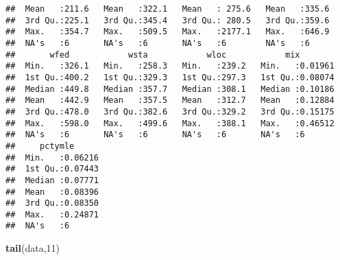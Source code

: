\documentclass[]{article}
\newenvironment{Shaded}{\begin{snugshade}}{\end{snugshade}}
\newcommand{\KeywordTok}[1]{\textcolor[rgb]{0.13,0.29,0.53}{\textbf{#1}}}
\newcommand{\DecValTok}[1]{\textcolor[rgb]{0.00,0.00,0.81}{#1}}
\newcommand{\NormalTok}[1]{#1}
\begin{document}
\begin{verbatim}
##  Mean   :211.6   Mean   :322.1   Mean   : 275.6   Mean   :335.6  
##  3rd Qu.:225.1   3rd Qu.:345.4   3rd Qu.: 280.5   3rd Qu.:359.6  
##  Max.   :354.7   Max.   :509.5   Max.   :2177.1   Max.   :646.9  
##  NA's   :6       NA's   :6       NA's   :6        NA's   :6      
##       wfed            wsta            wloc            mix         
##  Min.   :326.1   Min.   :258.3   Min.   :239.2   Min.   :0.01961  
##  1st Qu.:400.2   1st Qu.:329.3   1st Qu.:297.3   1st Qu.:0.08074  
##  Median :449.8   Median :357.7   Median :308.1   Median :0.10186  
##  Mean   :442.9   Mean   :357.5   Mean   :312.7   Mean   :0.12884  
##  3rd Qu.:478.0   3rd Qu.:382.6   3rd Qu.:329.2   3rd Qu.:0.15175  
##  Max.   :598.0   Max.   :499.6   Max.   :388.1   Max.   :0.46512  
##  NA's   :6       NA's   :6       NA's   :6       NA's   :6        
##     pctymle       
##  Min.   :0.06216  
##  1st Qu.:0.07443  
##  Median :0.07771  
##  Mean   :0.08396  
##  3rd Qu.:0.08350  
##  Max.   :0.24871  
##  NA's   :6
\end{verbatim}

\begin{Shaded}
\begin{Highlighting}[]
\KeywordTok{tail}\NormalTok{(data,}\DecValTok{11}\NormalTok{)}
\end{Highlighting}
\end{Shaded}
\end{document}
